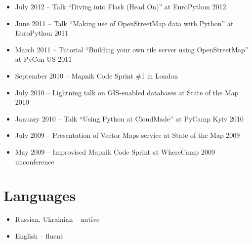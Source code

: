 \documentclass[margin]{res}
\begin{document}
\begin{resume}
\begin{itemize}
\item July 2012 -- Talk ``Diving into Flask (Head On)'' at EuroPython 2012
\item June 2011 -- Talk ``Making use of OpenStreetMap data with Python'' at EuroPython 2011
\item March 2011 -- Tutorial ``Building your own tile server using OpenStreetMap'' at PyCon US 2011
\item September 2010 -- Mapnik Code Sprint \#1 in London
\item July 2010 -- Lightning talk on GIS-enabled databases at State of the Map 2010
\item January 2010 -- Talk ``Using Python at CloudMade'' at PyCamp Kyiv 2010
\item July 2009 -- Presentation of Vector Maps service at State of the Map 2009
\item May 2009 -- Improvised Mapnik Code Sprint at WhereCamp 2009 unconference
\end{itemize}

\section{Languages}
\begin{itemize} \itemsep -1pt
\item Russian, Ukrainian -- native
\item English -- fluent
\end{itemize}

\end{resume}
\end{document}
